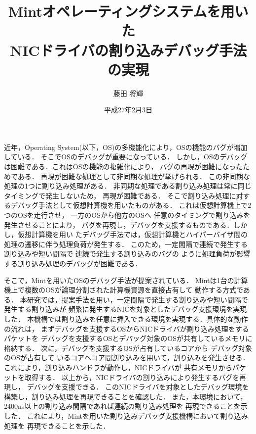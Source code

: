 \documentclass[tanilab-enum]{graduate}
\title{Mintオペレーティングシステムを用いた\\NICドライバの割り込みデバッグ手法の実現}
\author{藤田 将輝}
\date{平成27年2月3日}
\begin{document}
\maketitle

近年，Operating System(以下，OS)の多機能化により，OSの機能のバグが増加している．
そこでOSのデバッグが重要になっている．
しかし，OSのデバッグは困難である．これはOSの機能の複雑化により，
バグの再現が困難になったためである．
再現が困難な処理として非同期な処理が挙げられる．
この非同期な処理の1つに割り込み処理がある．
非同期な処理である割り込み処理は常に同じタイミングで発生しないため，
再現が困難である．
そこで割り込み処理に対するデバッグ手法として仮想計算機を用いたものがある．
これは仮想計算機上で2つのOSを走行させ，
一方のOSから他方のOSへ
任意のタイミングで割り込みを発生させることにより，
バグを再現し，デバッグを支援するものである．しかし，仮想計算機を用い
たデバッグ手法では，仮想計算機とハイパーバイザ間の
処理の遷移に伴う処理負荷が発生する．
このため，一定間隔で連続で発生する割り込みや短い間隔で
連続で発生する割り込みのバグの
ように処理負荷が影響する割り込み処理のデバッグが困難である．

そこで，Mintを用いたOSのデバッグ手法が提案されている．
Mintは1台の計算機上で複数のOSが論理分割された計算機資源を直接占有して
動作する方式である．
本研究では，提案手法を用い，一定間隔で発生する割り込みや短い間隔で発生する割り込みが
頻繁に発生するNICを対象としたデバッグ支援環境を実現した．
本機構では割り込みを任意に挿入できる環境を実現する．具体的な動作の流れは，
まずデバッグを支援するOSからNICドライバが割り込み処理をするパケットを
デバッグを支援するOSとデバッグ対象のOSが共有しているメモリに格納する．
次に，デバッグを支援するOSが占有しているコアから
デバッグ対象のOSが占有して
いるコアへコア間割り込みを用いて，割り込みを発生させる．
これにより，割り込みハンドラが動作し，NICドライバが
共有メモリからパケットを取得する．
以上から，NICドライバの割り込みにより発生するバグを再現し，
デバッグを支援できる．
このNICドライバを対象としたデバッグ環境を構築し，割り込み処理を再現できることを確認した．
また，本環境において，2400ns以上の割り込み間隔であれば連続の割り込み処理を
再現できることを示した．
これにより，Mintを用いた割り込みデバッグ支援機構において割り込み処理を
再現できることを示した．


\tableandlists%
\end{document}
